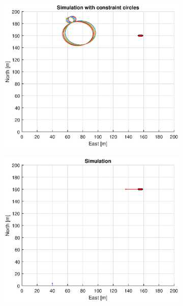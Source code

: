 \begin{figure}[!b]
\begin{subfigure}[b]{0.499\textwidth}
    \end{subfigure}
    \hfill
    \\
    \begin{subfigure}[b]{0.49\textwidth}
        \centering
        \includegraphics[width=\textwidth]{Images/Figures/sving_HO/Simple0_f1_Frame2}
    \end{subfigure}
    \hfill
    \begin{subfigure}[b]{0.499\textwidth}
        \centering
        \includegraphics[width=\textwidth]{Images/Figures/sving_HO/Simple0_f600_Frame2}

\end{subfigure}
\end{figure}
